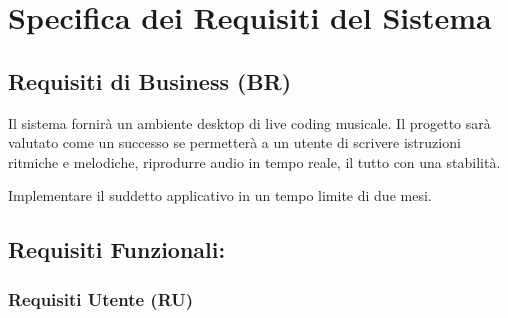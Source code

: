 
\section{Specifica dei Requisiti del Sistema}

\subsection{Requisiti di Business (BR)}

\begin{description}[leftmargin=0.5cm]
    \item[BR1 (Scopo e Successo):] Il sistema fornirà un ambiente desktop di live coding musicale. Il progetto sarà valutato come un successo se permetterà a un utente di scrivere istruzioni ritmiche e melodiche,
    riprodurre audio in tempo reale, il tutto con una stabilità.
    \item[BR2 (Deadline):] Implementare il suddetto applicativo in un tempo limite di due mesi.
\end{description}

\subsection{Requisiti Funzionali:}
\subsubsection{Requisiti Utente (RU)}

